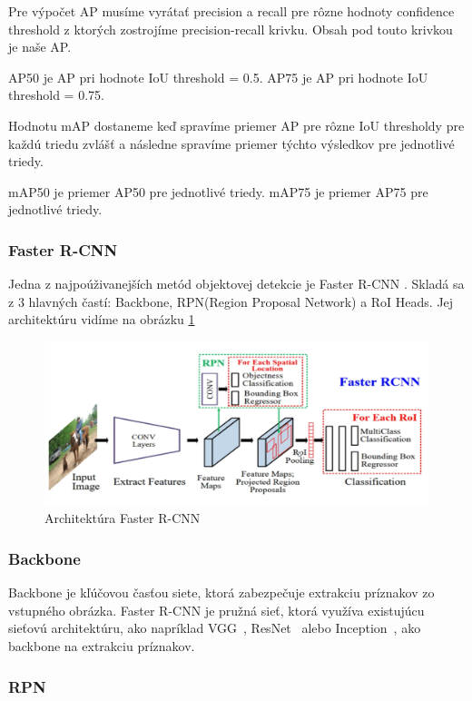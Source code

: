 Pre výpočet AP musíme vyrátať precision a recall pre rôzne hodnoty confidence threshold z ktorých zostrojíme precision-recall krivku. Obsah pod touto krivkou je naše AP. 

AP50 je AP pri hodnote IoU threshold = 0.5. AP75 je AP pri hodnote IoU threshold = 0.75.

Hodnotu mAP dostaneme keď spravíme priemer AP pre rôzne IoU thresholdy pre každú triedu zvlášť a následne spravíme priemer týchto výsledkov pre jednotlivé triedy. 

mAP50 je priemer AP50 pre jednotlivé triedy. mAP75 je priemer AP75 pre jednotlivé triedy.


\subsubsection{Faster R-CNN}

Jedna z najpoúživanejších metód objektovej detekcie je Faster R-CNN \cite{Faster}. Skladá sa z 3 hlavných častí: Backbone, RPN(Region Proposal Network) a RoI Heads. Jej architektúru vidíme na obrázku \ref{fig:faster}

\begin{figure}[H]
\includegraphics[width=\textwidth]{images/Faster.png}
\centering
\caption{Architektúra Faster R-CNN}
\label{fig:faster}
\end{figure}


\subsubsection{Backbone}

Backbone je kľúčovou časťou siete, ktorá zabezpečuje extrakciu príznakov zo vstupného obrázka. Faster R-CNN je pružná sieť, ktorá využíva existujúcu sieťovú architektúru, ako napríklad VGG~\cite{VGG}, ResNet~\cite{ResNet} alebo Inception~\cite{inception}, ako backbone na extrakciu príznakov.

\subsubsection{RPN}

